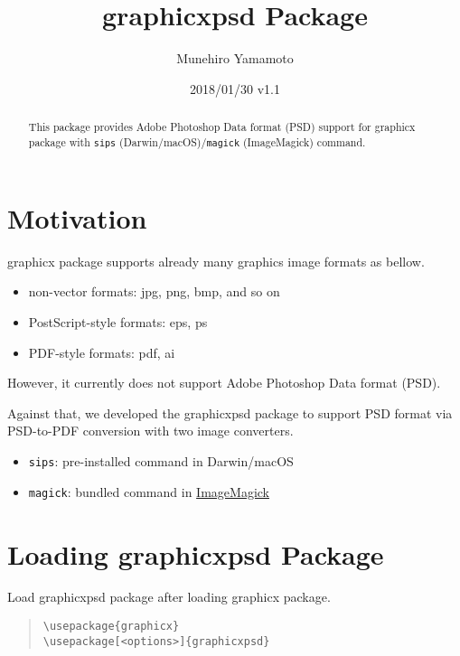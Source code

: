 \documentclass[luatex]{article}
\title{\textsf{graphicxpsd} Package}
\author{Munehiro Yamamoto}
\date{2018/01/30 v1.1}
\begin{document}
\maketitle
\begin{abstract}
This package provides Adobe Photoshop Data format (PSD) support 
for \textsf{graphicx} package
with \texttt{sips} (Darwin/macOS)/\texttt{magick} (ImageMagick) command.
\end{abstract}

\section{Motivation}
\textsf{graphicx} package supports already many graphics image formats as bellow. 
\begin{itemize}
\item non-vector formats: jpg, png, bmp, and so on
\item PostScript-style formats: eps, ps
\item PDF-style formats: pdf, ai
\end{itemize}
However, it currently does not support Adobe Photoshop Data format (PSD). 

Against that, we developed the \textsf{graphicxpsd} package 
to support PSD format via PSD-to-PDF conversion 
with two image converters.
\begin{itemize}
\item \texttt{sips}: 
pre-installed command in Darwin/macOS

\item \texttt{magick}: 
bundled command in \href{https://www.imagemagick.org/}{ImageMagick}
\end{itemize}

\section{Loading \textsf{graphicxpsd} Package}

Load \textsf{graphicxpsd} package after loading \textsf{graphicx} package.

\begin{quote}
\begin{verbatim}
\usepackage{graphicx}
\usepackage[<options>]{graphicxpsd}
\end{verbatim}
\end{quote}
\end{document}
